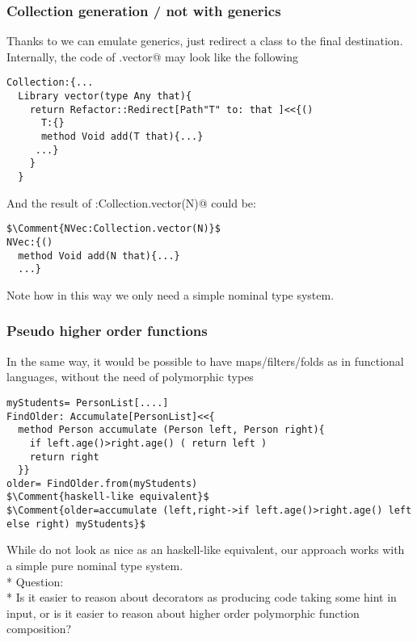 \begin{frame}[fragile]
\frametitle{Collection generation / not with generics}
Thanks to \Q@Adapt@ we can emulate generics, just redirect a class to the final destination.
Internally, the code of \Q@Collection.vector@ may look like the following
\begin{NiceCode}{59ex}{0.8}
\begin{lstlisting}
Collection:{...
  Library vector(type Any that){
    return Refactor::Redirect[Path"T" to: that ]<<{()
      T:{}
      method Void add(T that){...}
     ...}
    }
  }
\end{lstlisting}
\end{NiceCode}
And the result of \Q@NVec:Collection.vector(N)@ could be:
\begin{NiceCode}{59ex}{0.8}
\begin{lstlisting}
$\Comment{NVec:Collection.vector(N)}$
NVec:{()
  method Void add(N that){...}
  ...}
\end{lstlisting}
\end{NiceCode}


Note how in this way we only need a simple nominal type system.
\end{frame}


\begin{frame}[fragile]
\frametitle{Pseudo higher order functions}
In the same way, it would be possible to have maps/filters/folds as in functional languages, without the need of polymorphic types
\begin{NiceCode}{59ex}{0.8}
\begin{lstlisting}
myStudents= PersonList[....]
FindOlder: Accumulate[PersonList]<<{
  method Person accumulate (Person left, Person right){
    if left.age()>right.age() ( return left )
    return right
  }}
older= FindOlder.from(myStudents)
$\Comment{haskell-like equivalent}$
$\Comment{older=accumulate (left,right->if left.age()>right.age() left else right) myStudents}$
\end{lstlisting}
\end{NiceCode}
While do not look as nice as an haskell-like equivalent,
our approach works with a simple pure nominal type system.
\\*
\pause
\alert{Question:}
\\*
Is it easier to reason about decorators as producing code taking some hint in input, or
is it easier to reason about higher order polymorphic function composition?
\end{frame}


